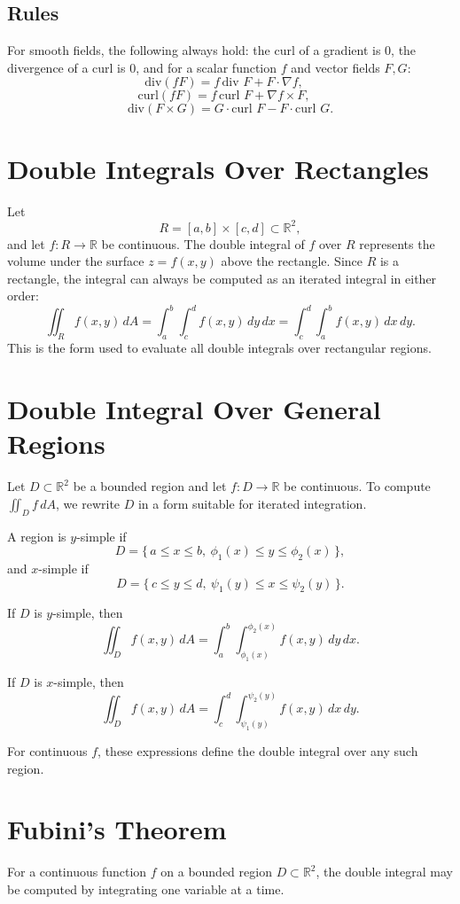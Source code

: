 \documentclass{article}
\begin{document}
\subsection{Rules}  
For smooth fields, the following always hold: the curl of a gradient is 0, the divergence of a curl is 0, and for a scalar function \(f\) and vector fields \(F, G\):  
\[\text{div}(fF) = f\,\text{div } F + F \cdot \nabla f, \quad\]
\[\text{curl}(fF) = f\,\text{curl } F + \nabla f \times F, \quad\]
\[\text{div}(F \times G) = G \cdot \text{curl } F - F \cdot \text{curl } G.\]

\section{Double Integrals Over Rectangles}
Let 
\[
R = [a,b] \times [c,d] \subset \mathbb{R}^2,
\]
and let \(f : R \to \mathbb{R}\) be continuous. The double integral of \(f\) over \(R\) represents the volume under the surface \(z = f(x,y)\) above the rectangle. Since \(R\) is a rectangle, the integral can always be computed as an iterated integral in either order:
\[
\iint_R f(x,y)\, dA
= \int_a^b \int_c^d f(x,y)\, dy\, dx
= \int_c^d \int_a^b f(x,y)\, dx\, dy.
\]
This is the form used to evaluate all double integrals over rectangular regions.

\section{Double Integral Over General Regions}

Let \(D \subset \mathbb{R}^2\) be a bounded region and let \(f : D \to \mathbb{R}\) be continuous.  
To compute \(\iint_D f\, dA\), we rewrite \(D\) in a form suitable for iterated integration.

A region is \(y\)-simple if
\[
D = \{\, a \le x \le b,\ \phi_1(x) \le y \le \phi_2(x) \,\},
\]
and \(x\)-simple if
\[
D = \{\, c \le y \le d,\ \psi_1(y) \le x \le \psi_2(y) \,\}.
\]

If \(D\) is \(y\)-simple, then
\[
\iint_D f(x,y)\, dA
= \int_a^b \int_{\phi_1(x)}^{\phi_2(x)} f(x,y)\, dy\, dx.
\]

If \(D\) is \(x\)-simple, then
\[
\iint_D f(x,y)\, dA
= \int_c^d \int_{\psi_1(y)}^{\psi_2(y)} f(x,y)\, dx\, dy.
\]

For continuous \(f\), these expressions define the double integral over any such region.

\section{Fubini's Theorem}
For a continuous function \(f\) on a bounded region \(D \subset \mathbb{R}^2\), the double integral may be computed by integrating one variable at a time.
\end{document}
